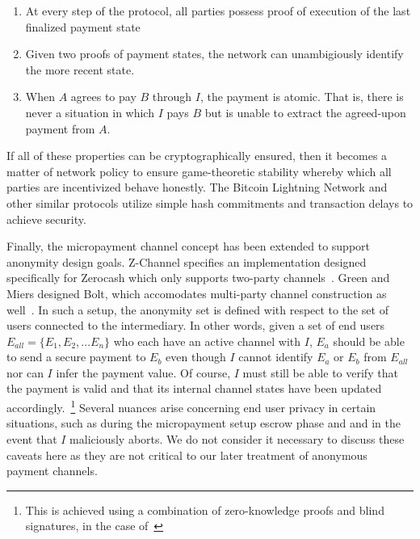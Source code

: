 \begin{enumerate}
\item At every step of the protocol, all parties possess proof of execution of
  the last finalized payment state
\item Given two proofs of payment states, the network can unambigiously identify
  the more recent state.
\item When $A$ agrees to pay $B$ through $I$, the payment is atomic. That is,
  there is never a situation in which $I$ pays $B$ but is unable to extract the
  agreed-upon payment from $A$.
\end{enumerate}

If all of these properties can be cryptographically ensured, then it becomes a
matter of network policy to ensure game-theoretic stability whereby which all
parties are incentivized behave honestly. The Bitcoin Lightning Network and
other similar protocols utilize simple hash commitments and transaction delays
to achieve security.

Finally, the micropayment channel concept has been extended to support anonymity
design goals. Z-Channel specifies an implementation designed specifically for
Zerocash which only supports two-party channels~\cite{zhang2017z}. Green and
Miers designed Bolt, which accomodates multi-party channel construction as
well~\cite{green2017bolt}. In such a setup, the anonymity set is defined with
respect to the set of users connected to the intermediary. In other words, given
a set of end users $E_{all} = \{E_1, E_2, ... E_n\}$ who each have an active
channel with $I$, $E_a$ should be able to send a secure payment to $E_b$ even
though $I$ cannot identify $E_a$ or $E_b$ from $E_{all}$ nor can $I$ infer the
payment value. Of course, $I$ must still be able to verify that the payment is
valid and that its internal channel states have been updated
accordingly.~\footnote{This is achieved using a combination of zero-knowledge
  proofs and blind signatures, in the case of~\cite{green2017bolt}} Several
nuances arise concerning end user privacy in certain situations, such as during
the micropayment setup escrow phase and and in the event that $I$ maliciously
aborts. We do not consider it necessary to discuss these caveats here as they
are not critical to our later treatment of anonymous payment channels.
